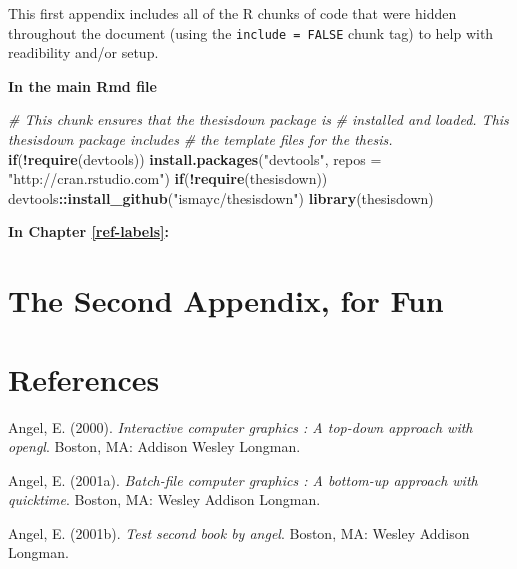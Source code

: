 \documentclass[12pt,twoside]{reedthesis}
\newenvironment{Shaded}{\begin{snugshade}}{\end{snugshade}}
\newcommand{\KeywordTok}[1]{\textcolor[rgb]{0.13,0.29,0.53}{\textbf{#1}}}
\newcommand{\DataTypeTok}[1]{\textcolor[rgb]{0.13,0.29,0.53}{#1}}
\newcommand{\StringTok}[1]{\textcolor[rgb]{0.31,0.60,0.02}{#1}}
\newcommand{\CommentTok}[1]{\textcolor[rgb]{0.56,0.35,0.01}{\textit{#1}}}
\newcommand{\ControlFlowTok}[1]{\textcolor[rgb]{0.13,0.29,0.53}{\textbf{#1}}}
\newcommand{\OperatorTok}[1]{\textcolor[rgb]{0.81,0.36,0.00}{\textbf{#1}}}
\newcommand{\NormalTok}[1]{#1}
\begin{document}
This first appendix includes all of the R chunks of code that were
hidden throughout the document (using the \texttt{include\ =\ FALSE}
chunk tag) to help with readibility and/or setup.

\textbf{In the main Rmd file}
\begin{Shaded}
\begin{Highlighting}[]
\CommentTok{# This chunk ensures that the thesisdown package is}
\CommentTok{# installed and loaded. This thesisdown package includes}
\CommentTok{# the template files for the thesis.}
\ControlFlowTok{if}\NormalTok{(}\OperatorTok{!}\KeywordTok{require}\NormalTok{(devtools))}
  \KeywordTok{install.packages}\NormalTok{(}\StringTok{"devtools"}\NormalTok{, }\DataTypeTok{repos =} \StringTok{"http://cran.rstudio.com"}\NormalTok{)}
\ControlFlowTok{if}\NormalTok{(}\OperatorTok{!}\KeywordTok{require}\NormalTok{(thesisdown))}
\NormalTok{  devtools}\OperatorTok{::}\KeywordTok{install_github}\NormalTok{(}\StringTok{"ismayc/thesisdown"}\NormalTok{)}
\KeywordTok{library}\NormalTok{(thesisdown)}
\end{Highlighting}
\end{Shaded}
\textbf{In Chapter \ref{ref-labels}:}

\chapter{The Second Appendix, for
Fun}\label{the-second-appendix-for-fun}

\backmatter

\chapter*{References}\label{references}


\noindent

\setlength{\parindent}{-0.20in} \setlength{\leftskip}{0.20in}
\setlength{\parskip}{8pt}

\hypertarget{refs}{}
\hypertarget{ref-angel2000}{}
Angel, E. (2000). \emph{Interactive computer graphics : A top-down
approach with opengl}. Boston, MA: Addison Wesley Longman.

\hypertarget{ref-angel2001}{}
Angel, E. (2001a). \emph{Batch-file computer graphics : A bottom-up
approach with quicktime}. Boston, MA: Wesley Addison Longman.

\hypertarget{ref-angel2002a}{}
Angel, E. (2001b). \emph{Test second book by angel}. Boston, MA: Wesley
Addison Longman.
\end{document}
